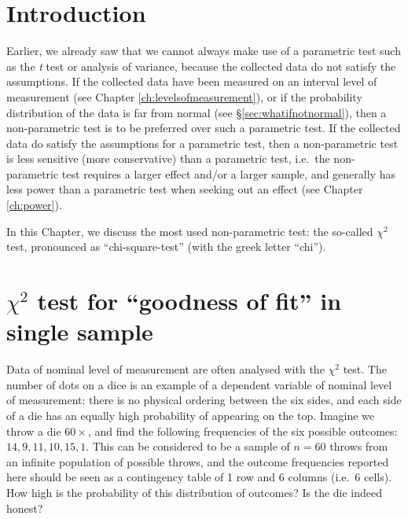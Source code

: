 \documentclass[
]{book}
\begin{document}
\hypertarget{sec:ch16introduction}{%
\section{Introduction}\label{sec:ch16introduction}}

Earlier, we already saw that we cannot always make use of a
parametric test such as the \emph{t} test or analysis of variance, because
the collected data do not satisfy the assumptions. If the collected data
have been measured on an interval level of measurement (see Chapter
\ref{ch:levelsofmeasurement}), or if the probability distribution
of the data is far from normal (see
§\ref{sec:whatifnotnormal}), then a non-parametric test is to be
preferred over such a parametric test. If the collected data
do satisfy the assumptions for a parametric test, then a non-parametric
test is less sensitive (more conservative) than a parametric test, i.e.~the
non-parametric test requires a larger effect and/or a larger sample, and generally
has less power than a parametric test when seeking out an effect
(see Chapter \ref{ch:power}).

In this Chapter, we discuss the most used non-parametric
test: the so-called \(\chi^2\) test, pronounced as ``chi-square-test'' (with the greek letter ``chi'').

\hypertarget{sec:chi2gof}{%
\section{\texorpdfstring{\(\chi^2\) test for ``goodness of fit'' in single sample}{\textbackslash chi\^{}2 test for ``goodness of fit'' in single sample}}\label{sec:chi2gof}}

Data of nominal level of measurement are often analysed with the
\(\chi^2\) test. The number of dots on a dice
is an example of a dependent variable of nominal level of measurement:
there is no physical ordering between the six sides, and each side of a die has
an equally high probability of appearing on the top. Imagine we throw
a die \(60\times\), and find the following frequencies
of the six possible outcomes: \(14, 9, 11, 10, 15, 1\). This can be
considered to be a sample of \(n=60\) throws from an infinite
population of possible throws, and the outcome frequencies reported here should
be seen as a contingency table of 1 row and 6
columns (i.e.~6 cells). How high is the probability of this distribution
of outcomes? Is the die indeed honest?
\end{document}
